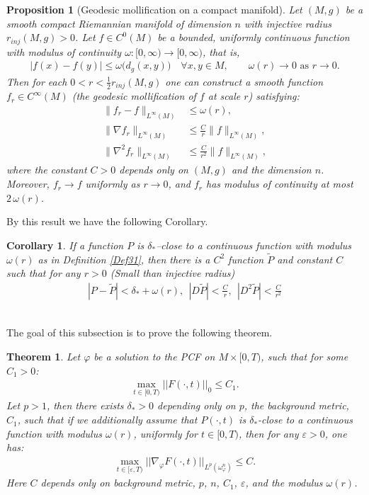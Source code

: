 \documentclass[11pt]{amsart}
\newtheorem{thm}{Theorem}[section]
\newtheorem{prop}[lem]{Proposition}
\newtheorem{cor}[lem]{Corollary}
\numberwithin{equation}{section}
\newcommand \eps{\varepsilon}
\begin{document}
\begin{prop}[Geodesic mollification on a compact manifold]\label{prop:geodesic-mollifier}
Let $(M,g)$ be a smooth compact Riemannian manifold of dimension $n$ with injective radius $r_{inj}(M,g)>0$. 
Let $f\in C^0(M)$ be a bounded, uniformly continuous function with modulus of continuity $\omega:[0,\infty)\to[0,\infty)$, that is,
\begin{align}
	|f(x)-f(y)|\le  \omega\!\big(d_g(x,y)\big)\quad\forall x,y\in M,  \qquad \omega(r)\to 0\text{ as }r\to0.
\end{align}
Then for each $0<r<\tfrac12 r_{inj}(M,g)$ one can construct a smooth function $f_r\in C^\infty(M)$ (the \emph{geodesic mollification of $f$ at scale $r$}) satisfying:
\begin{align}
	\|f_r-f\|_{L^\infty(M)} &\le  \omega(r), \\
	 \|\nabla f_r\|_{L^\infty(M)} &\le  \frac{C}{r}\|f\|_{L^\infty(M)}, \\
	\|\nabla^2 f_r\|_{L^\infty(M)} &\le  \frac{C}{r^{2}}\|f\|_{L^\infty(M)}, 
\end{align}
where the constant $C>0$ depends only on $(M,g)$ and the dimension $n$. 
Moreover, $f_r\to f$ uniformly as $r\to0$, and $f_r$ has modulus of continuity at most $2\,\omega(r)$. \\
\end{prop}
\noindent
By this result we have the following Corollary. \\
\begin{cor}\label{Cor30}
	If a function $P$ is $\delta_*$--close to a continuous function with modulus $\omega(r)$ as in Definition \ref{Def31}, then there is a $C^2$ function  $\widetilde P$ and constant $C$ such that for any $r>0$ (Small than injective radius)
	\begin{align}
		|P-\widetilde P|<\delta_*+\omega(r),\ \ |D \widetilde P|<\frac{C}{r},\ \ |D^2\widetilde P|<\frac{C}{r^2}
	\end{align} \\ 
\end{cor}


\noindent
The goal of this subsection is to prove the following theorem. \\

\begin{thm}\label{MT31}
	Let $\varphi$ be a solution to the PCF on $M\times [0,T)$,  such that for some $C_1>0$:
	\begin{align}
		\max_{t\in [0,T)}||F(\cdot,t)||_0\le  C_1.
	\end{align}
	Let $p>1$,  then there exists $\delta_*>0$ depending only on $p$,  the background metric,  $C_1$,  such that if we additionally assume that $P(\cdot,t)$ is $\delta_*$-close to a continuous function with modulus $\omega(r)$,  uniformly for $t\in [0,T)$,   then for any $\eps >0$,  one has:
	\begin{align}
		\max_{t\in [\eps ,T)}||\nabla_{\varphi} F(\cdot,t)||_{L^p(\omega_{\varphi}^n)}\le  C.
	\end{align}
	Here $C$ depends only on background metric,  $p$,  $n$,  $C_1$,  $\eps$,  and the modulus $\omega(r)$.\\
\end{thm}
\end{document}
